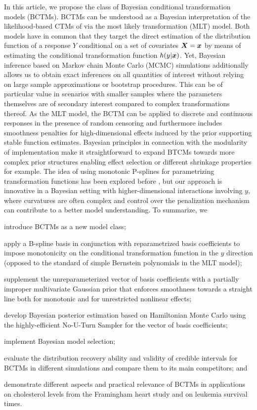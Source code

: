 \documentclass[12pt]{article}
\theoremstyle{plain}
\begin{document}
In this article, we propose the class of Bayesian conditional transformation models (BCTMs). BCTMs can be understood as a Bayesian interpretation of the likelihood-based CTMs of \cite{hothorn2018} via the most likely transformation (MLT) model. Both models have in common that they target the direct estimation of the distribution function of a response $Y$ conditional on a set of covariates $\text{\boldmath$X$} =\text{\boldmath$x$}$ by means of estimating the conditional transformation function $h(y|\text{\boldmath$x$})$. Yet, Bayesian inference based on Markov chain Monte Carlo (MCMC) simulations additionally allows us to obtain exact inferences on all quantities of interest without relying on large sample approximations or bootstrap procedures. This can be of particular value in scenarios with smaller samples where the parameters themselves are of secondary interest compared to complex transformations thereof. As the MLT model, the BCTM can be applied to discrete and continuous responses in the presence of random censoring and furthermore includes smoothness penalties for high-dimensional effects induced by the prior supporting stable function estimates. Bayesian principles in connection with the modularity of implementation make it straightforward to expand BTCMs towards more complex prior structures enabling effect selection or different shrinkage properties for example. The idea of using monotonic P-splines for parametrizing transformation functions has been explored before \citep[see e.g.,][]{song2012semiparametric,tang2018semiparametric}, but our approach is innovative in a Bayesian setting with higher-dimensional interactions involving $y$, where curvatures are often complex and control over the penalization mechanism can  contribute to a better model understanding.
To summarize,  we
\begin{compactitem}
\item introduce BCTMs as a new model class;
\item apply a B-spline basis in conjunction with reparametrized basis coefficients to impose monotonicity  on the conditional transformation function in the $y$ direction (opposed to the standard of simple Bernstein polynomials in the MLT model);
\item supplement the unreparameterized vector of basis coefficients with a partially improper multivariate Gaussian prior that enforces smoothness towards a straight line both for monotonic and for unrestricted nonlinear effects;
\item develop Bayesian posterior estimation based on Hamiltonian Monte Carlo \citep[HMC;][]{neal2011mcmc,betancourt2017conceptual} using the highly-efficient No-U-Turn Sampler \citep[NUTS,][]{hoffman2014no} for the vector of basis coefficients;
\item implement Bayesian model selection;
\item evaluate the distribution recovery ability and  validity of credible intervals for BCTMs in different simulations and compare them to its main competitors; and
\item demonstrate different aspects and  practical relevance of BCTMs in applications on cholesterol levels from the Framingham heart study and on leukemia survival times.
\end{compactitem}
\end{document}
